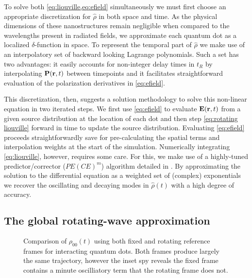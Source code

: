 \documentclass[conference]{IEEEtran}
\begin{document}
To solve both \cref{eq:liouville,eq:efield} simultaneously we must first choose an appropriate discretization for $\hat{\rho}$ in both space and time.
As the physical dimensions of these nanostructures remain negligible when compared to the wavelengths present in radiated fields, we approximate each quantum dot as a localized $\delta$-function in space.
To represent the temporal part of $\hat{\rho}$ we make use of an interpolatory set of backward looking Lagrange polynomials.
Such a set has two advantages: it easily accounts for non-integer delay times in $t_R$ by interpolating $\vb{P}(\vb{r}, t)$ between timepoints and it facilitates straightforward evaluation of the polarization derivatives in \cref{eq:efield}.

This discretization, then, suggests a solution methodology to solve this non-linear equation in two iterated steps. We first use \cref{eq:efield} to evaluate $\vb{E}(\vb{r}, t)$ from a given source distribution at the location of each dot and then step \cref{eq:rotating liouville} forward in time to update the source distribution.
Evaluating \cref{eq:efield} proceeds straightforwardly save for pre-calculating the spatial terms and interpolation weights at the start of the simulation.
Numerically integrating \cref{eq:liouville}, however, requires some care.
For this, we make use of a highly-tuned predictor/corrector ($PE(CE)^m$) algorithm detailed in \cite{Glaser2009}.
By approximating the solution to the differential equation as a weighted set of (complex) exponentials we recover the oscillating and decaying modes in $\hat{\rho}(t)$ with a high degree of accuracy.

\subsection{The global rotating-wave approximation}
\begin{figure}
  \centering
  
  \caption{\label{fig:frame comparison}
    Comparison of $\rho_{00}(t)$ using both fixed and rotating reference frames for interacting quantum dots.
    Both frames produce largely the same trajectory, however the inset spy reveals the fixed frame contains a minute oscilliatory term that the rotating frame does not.
  }
\end{figure}
\end{document}
